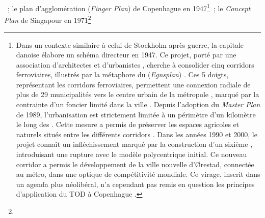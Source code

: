 \begin{refsegment}
{}~; le plan d'agglomération  (\textsl{Finger Plan}) de Copenhague en 1947\footnote{
    Dans un contexte similaire à celui de Stockholm après-guerre, la capitale danoise élabore un schéma directeur en 1947. Ce projet, porté par une association d'architectes et d'urbanistes \textcolor{blue}{\autocite[p.~132-153 (chapitre 5)]{cervero_transit_1998}}, cherche à consolider cinq corridors ferroviaires, illustrés par la métaphore du  (\textsl{Egnsplan}) \textcolor{blue}{\autocite[123-128]{teknisk_kontor_for_udvalget_til_planlaegning_af_kobenhavnsegnen_skitseforslag_1947}}. Ces 5 doigts, représentant les corridors ferroviaires, permettent une connexion radiale de plus de 29 municipalités vers le centre urbain de la métropole \textcolor{blue}{\autocite[]{fullerton_scandinavia_1991}}, marqué par la contrainte d'un foncier limité dans la ville \textcolor{blue}{\autocites[254]{knowles_transit_2012}[4-6]{the_danish_nature_agency_finger_2015}}. Depuis l'adoption du \textsl{Master Plan} de 1989, l'urbanisation est strictement limitée à un périmètre d'un kilomètre le long des . Cette mesure a permis de préserver les espaces agricoles et naturels situés entre les différents corridors \textcolor{blue}{\autocite[224]{vuk_transport_2005}}. Dans les années 1990 et 2000, le projet connaît un infléchissement marqué par la construction d'un sixième , introduisant une rupture avec le modèle polycentrique initial. Ce nouveau corridor a permis le développement de la ville nouvelle d'Ørestad, connectée au métro, dans une optique de compétitivité mondiale. Ce virage, inscrit dans un agenda plus néolibéral, n'a cependant pas remis en question les principes d'application du \acrshort{TOD} à Copenhague \textcolor{blue}{\autocites[103-105]{majoor_progressive_2008}[254]{knowles_transit_2012}}.
}~; le \textsl{Concept Plan} de Singapour en 1971\footnote{
}
\end{refsegment}
